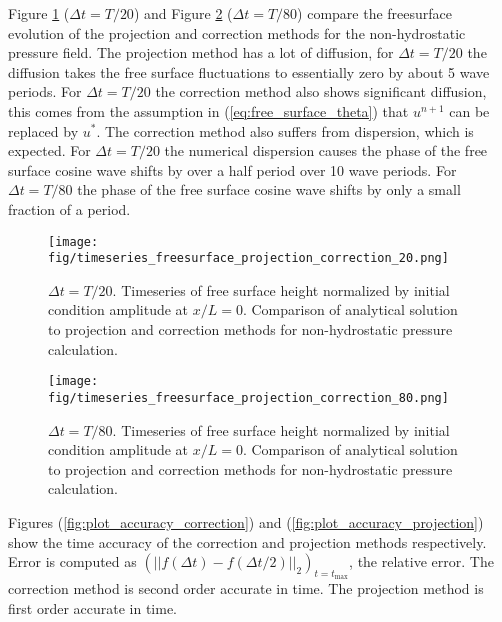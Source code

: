 \documentclass[12pt]{article}
\begin{document}
Figure \ref{fig:timeseries_freesurface_projection_correction_20} ($\Delta t = T/20$) and Figure \ref{fig:timeseries_freesurface_projection_correction_80} ($\Delta t = T/80$) compare the freesurface evolution of the projection and correction methods for the non-hydrostatic pressure field. The projection method has a lot of diffusion, for $\Delta t = T/20$ the diffusion takes the free surface fluctuations to essentially zero by about 5 wave periods. For $\Delta t = T/20$ the correction method also shows significant diffusion, this comes from the assumption in (\ref{eq:free_surface_theta}) that $u^{n+1}$ can be replaced by $u^*$. The correction method also suffers from dispersion, which is expected. For $\Delta t = T/20$ the numerical dispersion causes the phase of the free surface cosine wave shifts by over a half period over 10 wave periods. For $\Delta t = T/80$ the phase of the free surface cosine wave shifts by only a small fraction of a period.

	\begin{figure}[htb]
		\begin{center}
			\texttt{[image: fig/timeseries\_freesurface\_projection\_correction\_20.png]}
			\caption{$\Delta t = T/20$. Timeseries of free surface height normalized by initial condition amplitude at $x/L=0$. Comparison of analytical solution to projection and correction methods for non-hydrostatic pressure calculation.}
			\label{fig:timeseries_freesurface_projection_correction_20}
		\end{center}
	\end{figure}
	
	\begin{figure}[htb]
		\begin{center}
			\texttt{[image: fig/timeseries\_freesurface\_projection\_correction\_80.png]}
			\caption{$\Delta t = T/80$. Timeseries of free surface height normalized by initial condition amplitude at $x/L=0$. Comparison of analytical solution to projection and correction methods for non-hydrostatic pressure calculation.}
			\label{fig:timeseries_freesurface_projection_correction_80}
		\end{center}
	\end{figure}
\FloatBarrier

Figures (\ref{fig:plot_accuracy_correction}) and (\ref{fig:plot_accuracy_projection}) show the time accuracy of the correction and projection methods respectively. Error is computed as $(||f(\Delta t) - f(\Delta t / 2)||_2 )_{t=t_{\text{max}}}$, the relative error. The correction method is second order accurate in time. The projection method is first order accurate in time.
\end{document}
